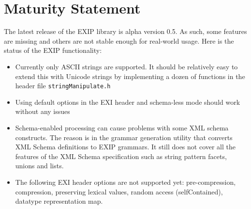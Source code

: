 \section{Maturity Statement}
\label{sec:Maturity-Statement}

The latest release of the EXIP library is alpha version 0.5. As such, 
some features are missing and others are not stable enough for real-world
usage. Here is the status of the EXIP functionality:

\begin{itemize}
 \item Currently only ASCII strings are supported. It should be relatively easy to extend
this with Unicode strings by implementing a dozen of functions in the header
file \texttt{stringManipulate.h}
 \item Using default options in the EXI header and schema-less mode should work without any issues
 \item Schema-enabled processing can cause problems with some XML schema constructs. The reason is in the
grammar generation utility that converts XML Schema definitions to EXIP grammars. It still does not cover
all the features of the XML Schema specification such as string pattern facets, unions and lists.
 \item The following EXI header options are not supported yet: pre-compression,
compression, preserving lexical values, random access (selfContained), datatype representation map.
\end{itemize}